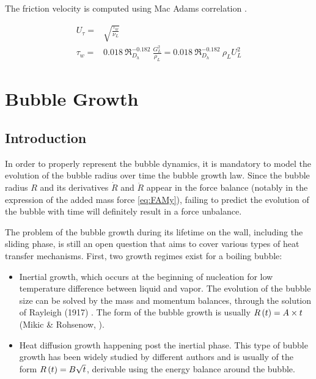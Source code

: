 The friction velocity is computed using Mac Adams correlation \cite{mcadams_heat_1954}.

\begin{align}
U_{\tau} =& \sqrt{\frac{\tau_{w}}{\nu_{L}}}
\label{eq:utau_mcadams}\\
\tau_{w} =& 0.018~ \Re_{D_{h}}^{-0.182}~ \frac{G_{L}^{2}}{\rho_{L}} = 0.018~ \Re_{D_{h}}^{-0.182}~ \rho_{L} U_{L}^{2}
\end{align}

\newpage


\section{Bubble Growth}
\label{sec:bub_growth}

\subsection{Introduction}

In order to properly represent the bubble dynamics, it is mandatory to model the evolution of the bubble radius over time \ie the bubble growth law. Since the bubble radius $R$ and its derivatives $\dot{R}$ and $\ddot{R}$ appear in the force balance (notably in the expression of the added mass force \ref{eq:FAMy}), failing to predict the evolution of the bubble with time will definitely result in a force unbalance.

\npar
The problem of the bubble growth during its lifetime on the wall, including the sliding phase, is still an open question that aims to cover various types of heat transfer mechanisms. First, two growth regimes exist for a boiling bubble:

\begin{itemize}
\item Inertial growth, which occurs at the beginning of nucleation for low temperature difference between liquid and vapor. The evolution of the bubble size can be solved by the mass and momentum balances, through the solution of Rayleigh (1917) \cite{rayleigh_viii_1917}. The form of the bubble growth is usually $R\left( t \right) = A\times t$ (Mikic \& Rohsenow, \cite{mikic_bubble_1970}).

\item Heat diffusion growth happening post the inertial phase. This type of bubble growth has been widely studied by different authors \cite{plesset_growth_1954, scriven_dynamics_1959, zuber_dynamics_1961, mikic_bubble_1970} and is usually of the form $R\left( t \right) = B\sqrt{t}$, derivable using the energy balance around the bubble.
\end{itemize}


